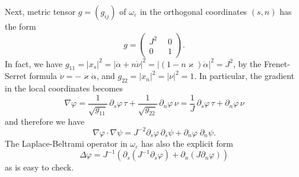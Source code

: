 \documentclass[reqno]{amsart}
\theoremstyle{plain}
\numberwithin{equation}{section}
\renewcommand{\kappa}{\varkappa}
\newcommand{\eps}{\varepsilon}
\renewcommand{\phi}{\varphi}
\begin{document}
Next, metric tensor $g=(g_{ij})$ of $\omega_\eps$ in the orthogonal coordinates $(s,n)$  has the form
  \begin{equation*}
    g=
    \begin{pmatrix}
      J^2\phantom{0} & 0 \\
          0\phantom{0} & 1
    \end{pmatrix}.
  \end{equation*}
In fact, we have
$g_{11}=|x_s|^2=|\dot{\alpha}+n \dot{\nu}|^2
=|(1-n\kappa) \dot{\alpha}|^2=J^2$,
by the Frenet-Serret formula $\dot{\nu}=-\kappa \dot{\alpha}$, and $g_{22}=|x_n|^2=|\nu|^2=1$.
In particular,  the gradient in the local coordinates becomes
\begin{equation*}
 \nabla \phi=\frac1{\sqrt{g_{11}}}\,\partial_s\phi\, \tau+\frac1{\sqrt{g_{22}}}\,\partial_n\phi\, \nu=\frac1J\,\partial_s\phi\, \tau+\partial_n\phi\, \nu
\end{equation*}
and  therefore we have
\begin{equation}\label{ScalarProdGrads}
  \nabla \phi\cdot \nabla \psi=J^{-2}\partial_s\phi\, \partial_s \psi+
\partial_n \phi\; \partial_n \psi.
\end{equation}
The Laplace-Beltrami operator in $\omega_\eps$ has also the explicit form
\begin{equation}\label{LaplacianInSN}
\Delta \phi=J^{-1}\left(\partial_s(J^{-1}\partial_s \phi)+ \partial_n(J\partial_n \phi)\right)
\end{equation}
as is easy to check.
%
\end{document}
